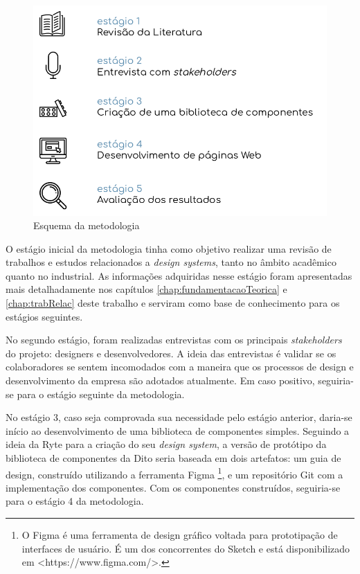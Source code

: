 \begin{figure}
	\includegraphics[width=\linewidth]{./04-figuras/04_metodologia/metodologia.png}
  \caption{Esquema da metodologia}
  \label{fig:metodology}
\end{figure}

O estágio inicial da metodologia tinha como objetivo realizar uma revisão de trabalhos e estudos relacionados a \textit{design systems}, tanto no âmbito acadêmico quanto no industrial. As informações adquiridas nesse estágio foram apresentadas mais detalhadamente nos capítulos \ref{chap:fundamentacaoTeorica} e \ref{chap:trabRelac} deste trabalho e serviram como base de conhecimento para os estágios seguintes.

No segundo estágio, foram realizadas entrevistas com os principais \textit{stakeholders} do projeto: designers e desenvolvedores. A ideia das entrevistas é validar se os colaboradores se sentem incomodados com a maneira que os processos de design e desenvolvimento da empresa são adotados atualmente. Em caso positivo, seguiria-se para o estágio seguinte da metodologia.

No estágio 3, caso seja comprovada sua necessidade pelo estágio anterior, daria-se início ao desenvolvimento de uma biblioteca de componentes simples. Seguindo a ideia da Ryte \cite{ryteDesignSystem} para a criação do seu \textit{design system}, a versão de protótipo da biblioteca de componentes da Dito seria baseada em dois artefatos: um guia de design, construído utilizando a ferramenta Figma \footnote{O Figma é uma ferramenta de design gráfico voltada para prototipação de interfaces de usuário. É um dos concorrentes do Sketch e está disponibilizado em <https://www.figma.com/>.}, e um repositório Git com a implementação dos componentes. Com os componentes construídos, seguiria-se para o estágio 4 da metodologia.

